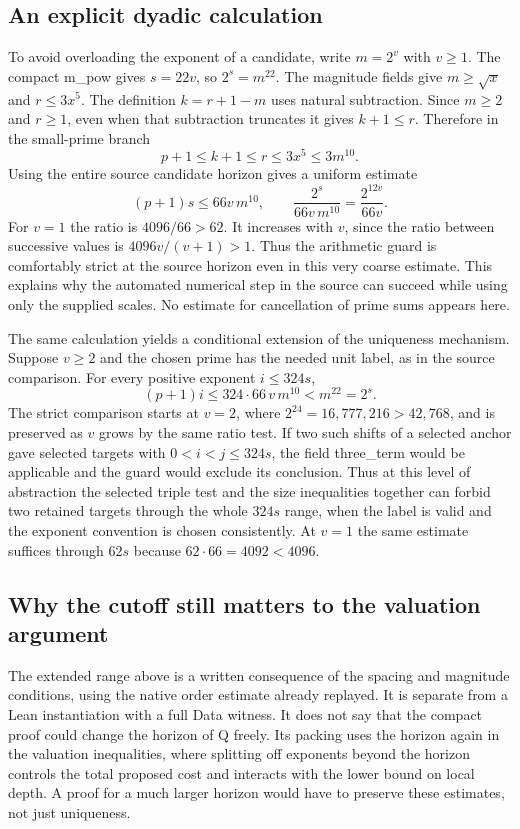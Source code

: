 \documentclass[12pt,letterpaper]{article}
\DeclareRobustCommand{\id}[1]{\mbox{\small\ttfamily #1}}
\begin{document}
\subsection{An explicit dyadic calculation}

To avoid overloading the exponent of a candidate, write \(m=2^v\) with \(v\ge1\). The compact \id{m\_pow} gives \(s=22v\), so \(2^s=m^{22}\). The magnitude fields give \(m\ge\sqrt x\) and \(r\le3x^5\). The definition \(k=r+1-m\) uses natural subtraction. Since \(m\ge2\) and \(r\ge1\), even when that subtraction truncates it gives \(k+1\le r\). Therefore in the small-prime branch
\[
             p+1\le k+1\le r\le3x^5\le3m^{10}.
\]
Using the entire source candidate horizon gives a uniform estimate
\[
     (p+1)s \le 66v\,m^{10}, \qquad
     \frac{2^s}{66v\,m^{10}}=\frac{2^{12v}}{66v}.
\]
For \(v=1\) the ratio is \(4096/66>62\). It increases with \(v\), since the ratio between successive values is \(4096v/(v+1)>1\). Thus the arithmetic guard is comfortably strict at the source horizon even in this very coarse estimate. This explains why the automated numerical step in the source can succeed while using only the supplied scales. No estimate for cancellation of prime sums appears here.

The same calculation yields a conditional extension of the uniqueness mechanism. Suppose \(v\ge2\) and the chosen prime has the needed unit label, as in the source comparison. For every positive exponent \(i\le324s\),
\[
        (p+1)i\le324\cdot66\,v\,m^{10}<m^{22}=2^s.
\]
The strict comparison starts at \(v=2\), where \(2^{24}=16{,}777{,}216>42{,}768\), and is preserved as \(v\) grows by the same ratio test. If two such shifts of a selected anchor gave selected targets with \(0<i<j\le324s\), the field \id{three\_term} would be applicable and the guard would exclude its conclusion. Thus at this level of abstraction the selected triple test and the size inequalities together can forbid two retained targets through the whole \(324s\) range, when the label is valid and the exponent convention is chosen consistently. At \(v=1\) the same estimate suffices through \(62s\) because \(62\cdot66=4092<4096\).

\subsection{Why the cutoff still matters to the valuation argument}

The extended range above is a written consequence of the spacing and magnitude conditions, using the native order estimate already replayed. It is separate from a Lean instantiation with a full \id{Data} witness. It does not say that the compact proof could change the horizon of \id{Q} freely. Its packing uses the horizon again in the valuation inequalities, where splitting off exponents beyond the horizon controls the total proposed cost and interacts with the lower bound on local depth. A proof for a much larger horizon would have to preserve these estimates, not just uniqueness.
\end{document}
